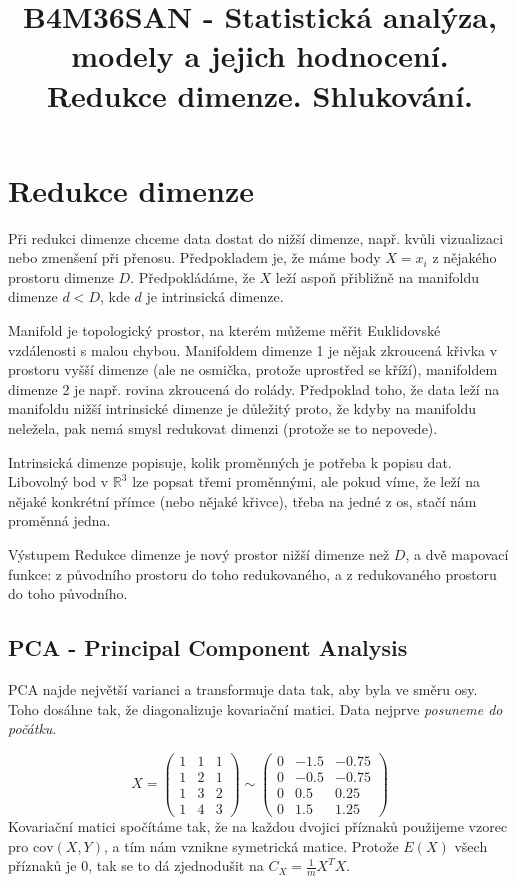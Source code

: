 \documentclass[10pt,a4paper]{article}
\title{B4M36SAN - Statistická analýza, modely a jejich hodnocení. Redukce dimenze. Shlukování.}
\date{}
\begin{document}
\maketitle

\section{Redukce dimenze}

Při redukci dimenze chceme data dostat do nižší dimenze, např. kvůli vizualizaci nebo zmenšení při přenosu. Předpokladem je, že máme body $X = {x_i}$ z nějakého prostoru dimenze $D$. Předpokládáme, že $X$ leží aspoň přibližně na manifoldu dimenze $d < D$, kde $d$ je intrinsická dimenze.

Manifold je topologický prostor, na kterém můžeme měřit Euklidovské vzdálenosti s malou chybou. Manifoldem dimenze 1 je nějak zkroucená křivka v prostoru vyšší dimenze (ale ne osmička, protože uprostřed se kříží), manifoldem dimenze 2 je např. rovina zkroucená do rolády. Předpoklad toho, že data leží na manifoldu nižší intrinsické dimenze je důležitý proto, že kdyby na manifoldu neležela, pak nemá smysl redukovat dimenzi (protože se to nepovede).

Intrinsická dimenze popisuje, kolik proměnných je potřeba k popisu dat. Libovolný bod v $\mathbb{R}^3$ lze popsat třemi proměnnými, ale pokud víme, že leží na nějaké konkrétní přímce (nebo nějaké křivce), třeba na jedné z os, stačí nám proměnná jedna.

Výstupem Redukce dimenze je nový prostor nižší dimenze než $D$, a dvě mapovací funkce: z původního prostoru do toho redukovaného, a z redukovaného prostoru do toho původního.

\subsection{PCA - Principal Component Analysis}

PCA najde největší varianci a transformuje data tak, aby byla ve směru osy. Toho dosáhne tak, že diagonalizuje kovariační matici. Data nejprve \textit{posuneme do počátku}.

\begin{equation}
X = 
\left( \begin{array}{ccc}
1 & 1 & 1\\
1 & 2 & 1\\
1 & 3 & 2\\
1 & 4 & 3 \end{array} \right)
%
\sim
%
\left( \begin{array}{ccc}
0 & -1.5 & -0.75\\
0 & -0.5 & -0.75\\
0 & 0.5 & 0.25\\
0 & 1.5 & 1.25 \end{array} \right)
\end{equation}
Kovariační matici spočítáme tak, že na každou dvojici příznaků použijeme vzorec pro $\text{cov}(X, Y)$, a tím nám vznikne symetrická matice. Protože $E(X)$ všech příznaků je 0, tak se to dá zjednodušit na $C_X = \frac{1}{m}X^TX$.
\end{document}
